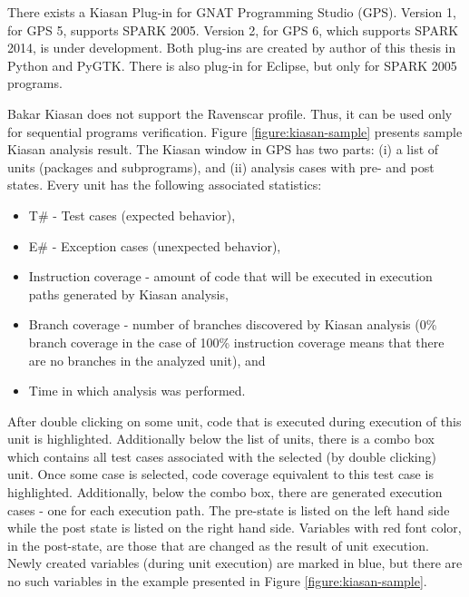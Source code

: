 There exists a Kiasan Plug-in for GNAT Programming Studio (GPS). Version 1, for GPS 5, supports SPARK 2005. Version 2, for GPS 6, which supports SPARK 2014, is under development. Both plug-ins are created by author of this thesis in Python and PyGTK. There is also plug-in for Eclipse, but only for SPARK 2005 programs.

Bakar Kiasan does not support the Ravenscar profile. Thus, it can be used only for sequential programs verification. Figure \ref{figure:kiasan-sample} presents sample Kiasan analysis result. The Kiasan window in GPS has two parts: (i) a list of units (packages and subprograms), and (ii) analysis cases with pre- and post states. Every unit has the following associated statistics:
\begin{itemize}
	\item T\# - Test cases (expected behavior),
	\item E\# - Exception cases (unexpected behavior),
	\item Instruction coverage - amount of code that will be executed in execution paths generated by Kiasan analysis,
	\item Branch coverage - number of branches discovered by Kiasan analysis (0\% branch coverage in the case of 100\% instruction coverage means that there are no branches in the analyzed unit), and
	\item Time in which analysis was performed.
\end{itemize}

After double clicking on some unit, code that is executed during execution of this unit is highlighted. Additionally below the list of units, there is a combo box which contains all test cases associated with the selected (by double clicking) unit. Once some case is selected, code coverage equivalent to this test case is highlighted. Additionally, below the combo box, there are generated execution cases - one for each execution path. The pre-state is listed on the left hand side while the post state is listed on the right hand side. Variables with red font color, in the post-state, are those that are changed as the result of unit execution. Newly created variables (during unit execution) are marked in blue, but there are no such variables in the example presented in Figure \ref{figure:kiasan-sample}.

